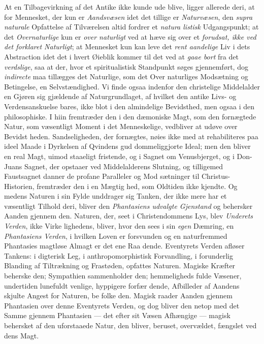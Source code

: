 At en Tilbagevirkning af det Antike ikke kunde ude\-%
blive, ligger allerede deri, at for Mennesket, der kun er
\emph{Aandsvæsen} idet det tillige er \emph{Naturvæsen}, den \emph{supra\-%
naturale} Opfattelse af Tilværelsen altid fordrer et \emph{natura\-%
listisk} Udgangspunkt; at det \emph{Overnaturlige} kun er \emph{over\-%
naturligt} ved at hæve sig over et \emph{forudsat, ikke ved det
forklaret Naturligt}; at Mennesket kun kan leve det \emph{rent
aandelige} Liv i dets Abstraction idet det i hvert Øieblik
kommer til det ved at \emph{gaae bort} fra det \emph{verdslige}, saa
at der, hvor et spiritualistisk Standpunkt søges gjennemført,
dog \emph{indirecte} maa tillægges det Naturlige, som det Over\-%
naturliges Modsætning og Betingelse, en Selvstændighed. Vi
finde ogsaa indenfor den christelige Middelalder en Gjøren sig
gjældende af Naturgrundlaget, af hvilket den antike Livs- og
Verdensanskuelse bares, ikke blot i den almindelige Bevidsthed,
men ogsaa i den philosophiske. I hiin fremtræder den i den
dæmoniske Magt, som den fornægtede Natur, som væsentligt
Moment i det Menneskelige, vedbliver at udøve over Bevidst\-%
heden. Sandseligheden, der fornægtes, nøies ikke med at
rehabiliteres paa ideel Maade i Dyrkelsen af Qvindens gud\-%
dommeliggjorte Ideal; men den bliver en real Magt, uimod\-%
staaeligt fristende, og i Sagnet om Venusbjerget, og i Don-Juans
Sagnet, der opstaaer ved Middelalderens Slutning, og
tilligemed Faustsagnet danner de profane Paralleler og Mod\-%
sætninger til Christus-Historien, fremtræder den i en Mægtig\-%
hed, som Oldtiden ikke kjendte. Og medens Naturen i sin
Fylde unddrager sig Tanken, der ikke mere har et væsentligt
Tilhold deri, bliver den \emph{Phantasiens udvalgte Gjenstand}
og behersker Aanden gjennem den. Naturen, der, seet i
Christendommens Lys, blev \emph{Underets Verden}, ikke Virke\-%
lighedens, bliver, hvor den sees i sin \emph{egen} Dæmring, en
 \emph{Phantasiens Verden}, i hvilken Loven er forsvunden og en
naturfremmed Phantasies magtløse Almagt er det ene Raa\-%
dende. Eventyrets Verden afløser Tankens: i digterisk Leg,
i anthropomorphistisk Forvandling, i forunderlig Blanding af
Tiltrækning og Frastøden, opfattes Naturen. Magiske Kræfter
beherske den; Sympathien sammenholder den; hemmeligheds\-%
fulde Væsener, undertiden lunefuldt venlige, hyppigere forfær\-%
dende, Afbilleder af Aandens skjulte Angest for Naturen, be\-%
folke den. Magisk raader Aanden gjennem Phantasien over
denne Eventyrets Verden, og dog bliver den netop med det
Samme gjennem Phantasien --- det efter sit Væsen Afhængige
--- magisk behersket af den uforstaaede Natur, den bliver,
beruset, overvældet, fængslet ved dens Magt.


